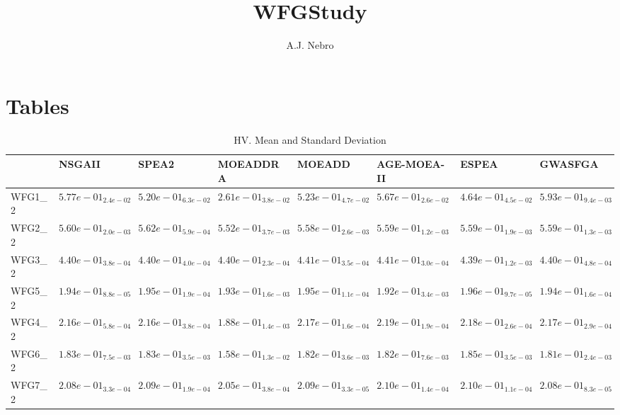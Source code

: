 \documentclass{article}
\title{WFGStudy}
\author{A.J. Nebro}
\begin{document}
\maketitle
\section{Tables}
\begin{landscape}

\begin{table}
\caption{HV. Mean and Standard Deviation}
\label{table: HV}
\centering
\begin{scriptsize}
\begin{tabular}{llllllll}
\hline & NSGAII & SPEA2 & MOEADDRA & MOEADD & AGE-MOEA-II & ESPEA &  GWASFGA\\
\hline 
WFG1\_2 & \cellcolor{gray25}$  5.77e-01_{ 2.4e-02}$ & $  5.20e-01_{ 6.3e-02}$ & $  2.61e-01_{ 3.8e-02}$ & $  5.23e-01_{ 4.7e-02}$ & $  5.67e-01_{ 2.6e-02}$ & $  4.64e-01_{ 4.5e-02}$ & \cellcolor{gray95}$  5.93e-01_{ 9.4e-03}$ \\
WFG2\_2 & \cellcolor{gray25}$  5.60e-01_{ 2.0e-03}$ & \cellcolor{gray95}$  5.62e-01_{ 5.9e-04}$ & $  5.52e-01_{ 3.7e-03}$ & $  5.58e-01_{ 2.6e-03}$ & $  5.59e-01_{ 1.2e-03}$ & $  5.59e-01_{ 1.9e-03}$ & $  5.59e-01_{ 1.3e-03}$ \\
WFG3\_2 & $  4.40e-01_{ 3.8e-04}$ & $  4.40e-01_{ 4.0e-04}$ & $  4.40e-01_{ 2.3e-04}$ & \cellcolor{gray25}$  4.41e-01_{ 3.5e-04}$ & \cellcolor{gray95}$  4.41e-01_{ 3.0e-04}$ & $  4.39e-01_{ 1.2e-03}$ & $  4.40e-01_{ 4.8e-04}$ \\
WFG5\_2 & $  1.94e-01_{ 8.8e-05}$ & \cellcolor{gray25}$  1.95e-01_{ 1.9e-04}$ & $  1.93e-01_{ 1.6e-03}$ & $  1.95e-01_{ 1.1e-04}$ & $  1.92e-01_{ 3.4e-03}$ & \cellcolor{gray95}$  1.96e-01_{ 9.7e-05}$ & $  1.94e-01_{ 1.6e-04}$ \\
WFG4\_2 & $  2.16e-01_{ 5.8e-04}$ & $  2.16e-01_{ 3.8e-04}$ & $  1.88e-01_{ 1.4e-03}$ & $  2.17e-01_{ 1.6e-04}$ & \cellcolor{gray95}$  2.19e-01_{ 1.9e-04}$ & \cellcolor{gray25}$  2.18e-01_{ 2.6e-04}$ & $  2.17e-01_{ 2.9e-04}$ \\
WFG6\_2 & \cellcolor{gray25}$  1.83e-01_{ 7.5e-03}$ & $  1.83e-01_{ 3.5e-03}$ & $  1.58e-01_{ 1.3e-02}$ & $  1.82e-01_{ 3.6e-03}$ & $  1.82e-01_{ 7.6e-03}$ & \cellcolor{gray95}$  1.85e-01_{ 3.5e-03}$ & $  1.81e-01_{ 2.4e-03}$ \\
WFG7\_2 & $  2.08e-01_{ 3.3e-04}$ & $  2.09e-01_{ 1.9e-04}$ & $  2.05e-01_{ 3.8e-04}$ & $  2.09e-01_{ 3.3e-05}$ & \cellcolor{gray95}$  2.10e-01_{ 1.4e-04}$ & \cellcolor{gray25}$  2.10e-01_{ 1.1e-04}$ & $  2.08e-01_{ 8.3e-05}$ \\

\end{tabular}
\end{scriptsize}
\end{table}
\end{landscape}
\end{document}
